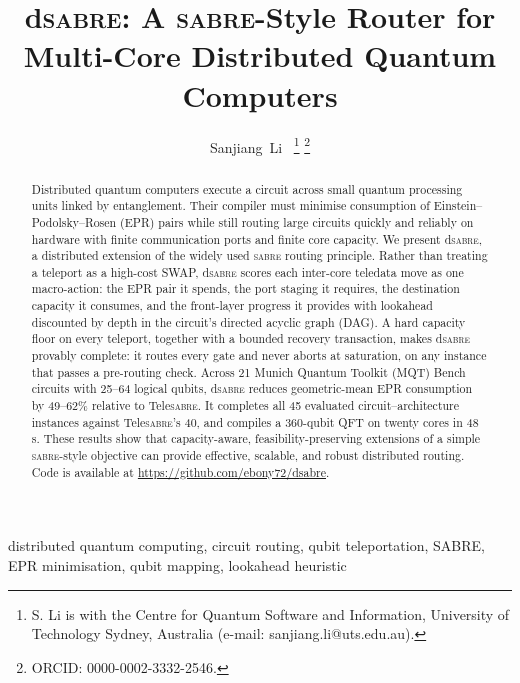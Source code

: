 \documentclass[journal]{IEEEtran}
\newcommand{\dSABRE}{d\textsc{sabre}}
\newcommand{\TeleSABRE}{Tele\textsc{sabre}}
\newcommand{\SABRE}{\textsc{sabre}}
\begin{document}
\title{\dSABRE{}: A \SABRE{}-Style Router for Multi-Core Distributed Quantum Computers}

\author{Sanjiang~Li~%
\thanks{S. Li is with the Centre for Quantum Software and Information,
  University of Technology Sydney, Australia
  (e-mail: sanjiang.li@uts.edu.au).}%
\thanks{ORCID: 0000-0002-3332-2546.}}

\maketitle

\begin{abstract}
Distributed quantum computers execute a circuit across small quantum processing
units linked by entanglement. Their compiler must minimise consumption of
Einstein--Podolsky--Rosen (EPR) pairs while still routing large circuits
quickly and reliably on hardware with finite communication ports and finite
core capacity. We present \dSABRE{}, a distributed extension of the
widely used \SABRE{} routing principle. Rather than treating a teleport as a
high-cost SWAP, \dSABRE{} scores each inter-core teledata move as one
macro-action: the EPR pair it spends, the port staging it requires,
the destination capacity it consumes, and the front-layer progress
it provides with lookahead discounted by depth in the circuit's directed
acyclic graph (DAG). A hard capacity floor on every teleport, together with a
bounded recovery transaction, makes \dSABRE{} provably complete: it routes
every gate and never aborts at saturation, on any instance that passes a
pre-routing check. Across 21 Munich
Quantum Toolkit (MQT) Bench circuits with 25--64 logical qubits, \dSABRE{}
reduces geometric-mean EPR consumption by 49--62\% relative to \TeleSABRE{}.
It completes all 45 evaluated circuit--architecture instances against
\TeleSABRE{}'s 40, and compiles a 360-qubit QFT on twenty cores
in 48\,s. These results
show that capacity-aware, feasibility-preserving extensions of a simple
\SABRE{}-style objective can provide effective, scalable, and robust distributed
routing. Code is available at \url{https://github.com/ebony72/dsabre}.
\end{abstract}

\begin{IEEEkeywords}
distributed quantum computing, circuit routing, qubit teleportation,
SABRE, EPR minimisation, qubit mapping, lookahead heuristic
\end{IEEEkeywords}
\end{document}
